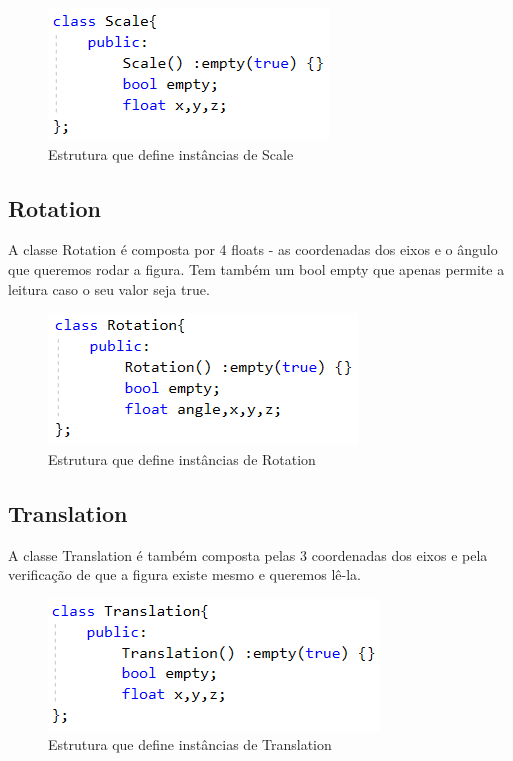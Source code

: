 \documentclass[a4paper]{article}
\begin{document}
\begin{figure}[H]
\centering
\includegraphics[scale=0.8]{scale.png}
\caption{Estrutura que define instâncias de Scale}
\label{img:Scale}
\end{figure}


\subsection{Rotation}
\label{sec:rotation}

A classe Rotation é composta por 4 floats - as coordenadas dos eixos e o ângulo que queremos rodar a figura. Tem também um bool empty que apenas permite a leitura caso o seu valor seja true.

\begin{figure}[H]
\centering
\includegraphics[scale=0.8]{rotation.png}
\caption{Estrutura que define instâncias de Rotation}
\label{img:Rotation}
\end{figure}


\subsection{Translation}
\label{sec:translation}

A classe Translation é também composta pelas 3 coordenadas dos eixos e pela verificação de que a figura existe mesmo e queremos lê-la.

\begin{figure}[H]
\centering
\includegraphics[scale=0.8]{translation.png}
\caption{Estrutura que define instâncias de Translation}
\label{img:Tree}
\end{figure}
\end{document}

